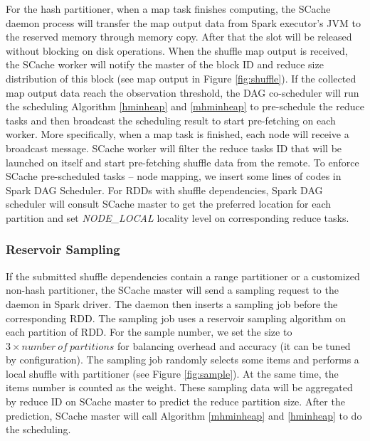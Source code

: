 For the hash partitioner, when a map task finishes computing, the SCache daemon process will transfer the map output data from Spark executor's JVM to the reserved memory through memory copy.
After that the slot will be released without blocking on disk operations.
When the shuffle map output is received, the SCache worker will notify the master of the block ID and reduce size distribution of this block (see map output in Figure \ref{fig:shuffle}).
If the collected map output data reach the observation threshold, the DAG co-scheduler will run the scheduling Algorithm \ref{hminheap} and \ref{mhminheap} to pre-schedule the reduce tasks and then broadcast the scheduling result to start pre-fetching on each worker.
More specifically, when a map task is finished, each node will receive a broadcast message. SCache worker will filter the reduce tasks ID that will be launched on itself and start pre-fetching shuffle data from the remote. 
To enforce SCache pre-scheduled tasks -- node mapping, we insert some lines of codes in Spark DAG Scheduler.
For RDDs with shuffle dependencies, Spark DAG scheduler will consult SCache master to get the preferred location for each partition and set \textit{NODE\_LOCAL} locality level on corresponding reduce tasks.

\subsubsection{Reservoir Sampling}\label{sampling}
If the submitted shuffle dependencies contain a range partitioner or a customized non-hash partitioner, the SCache master will send a sampling request to the daemon in Spark driver. The daemon then inserts a sampling job before the corresponding RDD. The sampling job uses a reservoir sampling algorithm \cite{reservoir} on each partition of RDD. For the sample number, we set the size to $3 \times number\ of\ partitions$ for balancing overhead and accuracy (it can be tuned by configuration). The sampling job randomly selects some items and performs a local shuffle with partitioner (see Figure \ref{fig:sample}). At the same time, the items number is counted as the weight. These sampling data will be aggregated by reduce ID on SCache master to predict the reduce partition size. After the prediction, SCache master will call Algorithm \ref{mhminheap} and \ref{hminheap} to do the scheduling.

